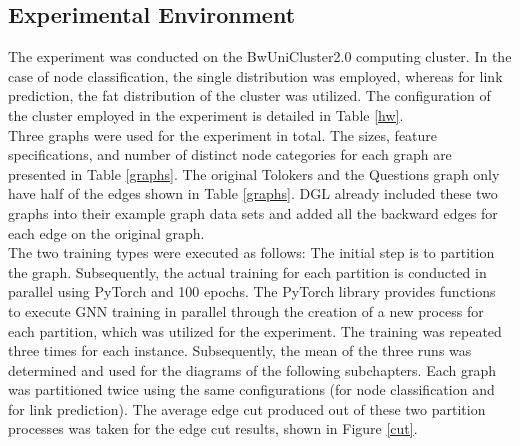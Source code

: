 \documentclass[acmsmall,nonacm,screen,review]{acmart}
\begin{document}
\subsection{Experimental Environment}
The experiment was conducted on the BwUniCluster2.0 computing cluster. In the case of node classification, the single distribution was employed, whereas for link prediction, the fat distribution of the cluster was utilized. The configuration of the cluster employed in the experiment is detailed in Table \ref{hw}.\\
Three graphs were used for the experiment in total. The sizes, feature specifications, and number of distinct node categories for each graph are presented in Table \ref{graphs}. The original Tolokers and the Questions graph only have half of the edges shown in Table \ref{graphs}. DGL already included these two graphs into their example graph data sets and added all the backward edges for each edge on the original graph.\\
The two training types were executed as follows: The initial step is to partition the graph. Subsequently, the actual training for each partition is conducted in parallel using PyTorch \cite{PyTorch} and 100 epochs. The PyTorch library provides functions to execute GNN training in parallel through the creation of a new process for each partition, which was utilized for the experiment. The training was repeated three times for each instance. Subsequently, the mean of the three runs was determined and used for the diagrams of the following subchapters. Each graph was partitioned twice using the same configurations (for node classification and for link prediction). The average edge cut produced out of these two partition processes was taken for the edge cut results, shown in Figure \ref{cut}.
\end{document}
